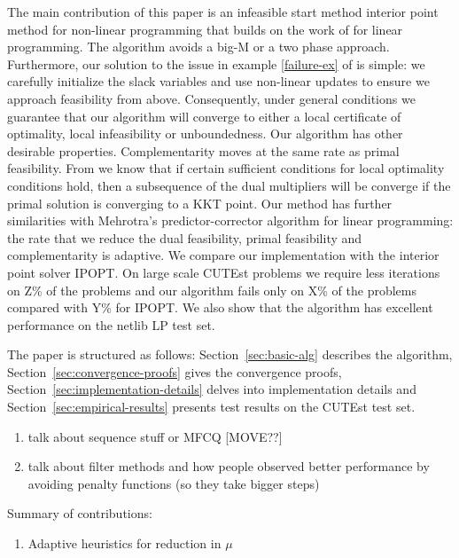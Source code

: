 \documentclass{article}
\begin{document}
The main contribution of this paper is an infeasible start method interior point method for non-linear programming that builds on the work of \cite{lustig1990feasibility, mehrotra1992implementation} for linear programming. The algorithm avoids a big-M or a two phase approach. Furthermore, our solution to the issue in example \eqref{failure-ex} of \cite{wachter2000failure} is simple: we   carefully initialize the slack variables and use non-linear updates to ensure we approach feasibility from above. Consequently, under general conditions we guarantee that our algorithm will converge to either a local certificate of optimality, local infeasibility or unboundedness. Our algorithm has other desirable properties. Complementarity moves at the same rate as primal feasibility. From \cite{lagIPM} we know that if certain sufficient conditions for local optimality conditions hold, then a subsequence of the dual multipliers will be converge if the primal solution is converging to a KKT point.  Our method has further similarities with Mehrotra's \cite{mehrotra1992implementation} predictor-corrector algorithm for linear programming: the rate that we reduce the dual feasibility, primal feasibility and complementarity is adaptive.
We compare our implementation with the interior point solver IPOPT. On large scale CUTEst problems we require less iterations on Z\% of the problems and our algorithm fails only on X\% of the problems compared with Y\% for IPOPT. We also show that the algorithm has excellent performance on the netlib LP test set.


The paper is structured as follows: Section~\ref{sec:basic-alg} describes the algorithm, Section~\ref{sec:convergence-proofs} gives the convergence proofs, Section~\ref{sec:implementation-details} delves into implementation details and Section~\ref{sec:empirical-results} presents test results on the CUTEst test set.


{\color{red}
\begin{enumerate}
\item talk about sequence stuff or MFCQ [MOVE??]
\item talk about filter methods and how people observed better performance by avoiding penalty functions (so they take bigger steps)
\end{enumerate}


Summary of contributions:

\begin{enumerate}
\item Adaptive heuristics for reduction in $\mu$
\end{enumerate}
}
\end{document}

